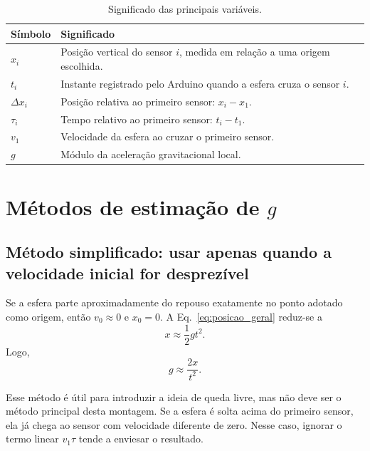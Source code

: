 \documentclass[11pt,a4paper]{article}
\begin{document}
\begin{table}[htbp]
\centering
\caption{Significado das principais variáveis.}
\label{tab:variables}
\begin{tabularx}{\textwidth}{>{\raggedright\arraybackslash}p{}X}
\toprule
\textbf{Símbolo} & \textbf{Significado} \\
\midrule
$x_i$ & Posição vertical do sensor $i$, medida em relação a uma origem escolhida. \\
$t_i$ & Instante registrado pelo Arduino quando a esfera cruza o sensor $i$. \\
$\Delta x_i$ & Posição relativa ao primeiro sensor: $x_i-x_1$. \\
$\tau_i$ & Tempo relativo ao primeiro sensor: $t_i-t_1$. \\
$v_1$ & Velocidade da esfera ao cruzar o primeiro sensor. \\
$g$ & Módulo da aceleração gravitacional local. \\
\bottomrule
\end{tabularx}
\end{table}

\section{Métodos de estimação de $g$}

\subsection{Método simplificado: usar apenas quando a velocidade inicial for desprezível}

Se a esfera parte aproximadamente do repouso exatamente no ponto adotado como origem, então $v_0\approx0$ e $x_0=0$. A Eq.~\eqref{eq:posicao_geral} reduz-se a
\begin{equation}
  x\approx \frac{1}{2}gt^2.
\end{equation}
Logo,
\begin{equation}
  g\approx \frac{2x}{t^2}.
  \label{eq:g_simplificado}
\end{equation}

Esse método é útil para introduzir a ideia de queda livre, mas não deve ser o método principal desta montagem. Se a esfera é solta acima do primeiro sensor, ela já chega ao sensor com velocidade diferente de zero. Nesse caso, ignorar o termo linear $v_1\tau$ tende a enviesar o resultado.
\end{document}
